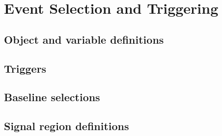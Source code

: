 \chapter{Event Selection and Triggering}

\section{Object and variable definitions}

\section{Triggers}

\section{Baseline selections}

\section{Signal region definitions}
